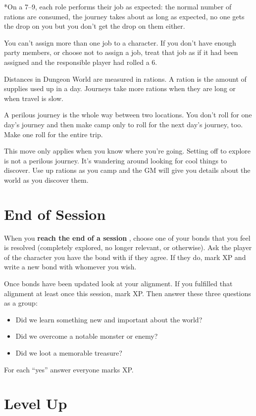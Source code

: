  *On a 7--9, each role performs their job as expected: the normal number of rations are consumed, the journey takes about as long as expected, no one gets the drop on you but you don't get the drop on them either.


 You can't assign more than one job to a character. If you don't have enough party members, or choose not to assign a job, treat that job as if it had been assigned and the responsible player had rolled a 6.


 Distances in Dungeon World are measured in rations. A ration is the amount of supplies used up in a day. Journeys take more rations when they are long or when travel is slow.


 A perilous journey is the whole way between two locations. You don't roll for one day's journey and then make camp only to roll for the next day's journey, too. Make one roll for the entire trip.


 This move only applies when you know where you're going. Setting off to explore is not a perilous journey. It's wandering around looking for cool things to discover. Use up rations as you camp and the GM will give you details about the world as you discover them.
\section{End of Session}


 When you \textbf{reach the end of a session}
, choose one of your bonds that you feel is resolved (completely explored, no longer relevant, or otherwise). Ask the player of the character you have the bond with if they agree. If they do, mark XP and write a new bond with whomever you wish.


 Once bonds have been updated look at your alignment. If you fulfilled that alignment at least once this session, mark XP. Then answer these three questions as a group:
\begin{itemize}
\item Did we learn something new and important about the world?
\item Did we overcome a notable monster or enemy?
\item Did we loot a memorable treasure?

\end{itemize}


 For each ``yes'' answer everyone marks XP.
\section{Level Up}


